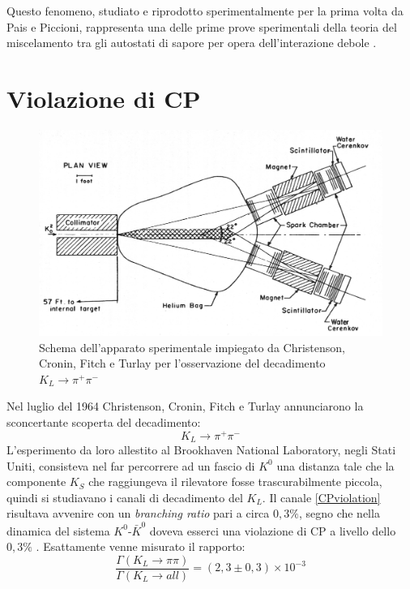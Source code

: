 Questo fenomeno, studiato e riprodotto sperimentalmente per la
prima volta da Pais e Piccioni, rappresenta una delle prime prove sperimentali della teoria del miscelamento tra gli autostati di sapore per opera dell'interazione debole \cite{Kabir}.

\section{Violazione di CP}
\begin{figure}
\begin{center}
\includegraphics[scale=0.1]{Immagini/rilevatore}
\caption{Schema dell'apparato sperimentale impiegato da  Christenson, Cronin, Fitch e Turlay per l'osservazione del decadimento $K_L \longrightarrow \pi^+ \pi^-$}
\end{center}
\end{figure}
\noindent
Nel luglio del 1964 Christenson, Cronin, Fitch e Turlay annunciarono la sconcertante scoperta del decadimento:
\begin{equation}\label{CPviolation}
 K_L \longrightarrow \pi^+ \pi^-
\end{equation}
L'esperimento da loro allestito al Brookhaven National Laboratory, negli Stati Uniti, consisteva nel far percorrere ad un fascio di $K^0$ una distanza tale che la 
componente $K_S$ che raggiungeva il rilevatore fosse trascurabilmente piccola, quindi si studiavano i canali di decadimento del $K_L$.
Il canale \eqref{CPviolation} risultava avvenire con un \emph{branching ratio} pari a circa $0,3\%$, segno che nella dinamica del sistema $K^0$-$\bar{K}^0$
doveva esserci una violazione di CP a livello dello $0,3\%$ \cite{Krane}. 
Esattamente venne misurato il rapporto:
\begin{equation}
\frac{\Gamma (K_L\rightarrow \pi\pi)}{\Gamma (K_L\rightarrow all)} = (2,3 \pm 0,3) × 10^{−3}
 \end{equation}
